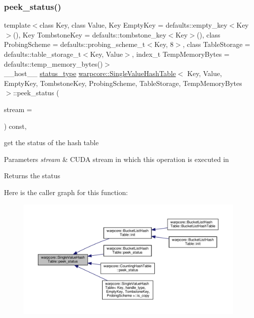 \subsubsection{\texorpdfstring{peek\+\_\+status()}{peek\_status()}}
{\footnotesize\ttfamily template$<$class Key, class Value, Key Empty\+Key = defaults\+::empty\+\_\+key$<$\+Key$>$(), Key Tombstone\+Key = defaults\+::tombstone\+\_\+key$<$\+Key$>$(), class Probing\+Scheme = defaults\+::probing\+\_\+scheme\+\_\+t$<$\+Key, 8$>$, class Table\+Storage = defaults\+::table\+\_\+storage\+\_\+t$<$\+Key, Value$>$, index\+\_\+t Temp\+Memory\+Bytes = defaults\+::temp\+\_\+memory\+\_\+bytes()$>$ \\
\+\_\+\+\_\+host\+\_\+\+\_\+ \hyperlink{classwarpcore_1_1Status}{status\+\_\+type} \hyperlink{classwarpcore_1_1SingleValueHashTable}{warpcore\+::\+Single\+Value\+Hash\+Table}$<$ Key, Value, Empty\+Key, Tombstone\+Key, Probing\+Scheme, Table\+Storage, Temp\+Memory\+Bytes $>$\+::peek\+\_\+status (\begin{DoxyParamCaption}\item[{const cuda\+Stream\+\_\+t}]{stream = {} }\end{DoxyParamCaption}) const\hspace{0.3cm}{\ttfamily [inline]}, {\ttfamily [noexcept]}}



get the status of the hash table 


\begin{DoxyParams}{Parameters}
{\em stream} & C\+U\+DA stream in which this operation is executed in \\
\hline
\end{DoxyParams}
\begin{DoxyReturn}{Returns}
the status 
\end{DoxyReturn}
Here is the caller graph for this function\+:
\nopagebreak
\begin{figure}[H]
\begin{center}
\leavevmode
\includegraphics[width=350pt]{classwarpcore_1_1SingleValueHashTable_aeb3d8cabf825ff16453be9bfb1556085_icgraph}
\end{center}
\end{figure}
\mbox{\label{classwarpcore_1_1SingleValueHashTable_a46feca31bb400c78542b101456cd3cfe}} 
